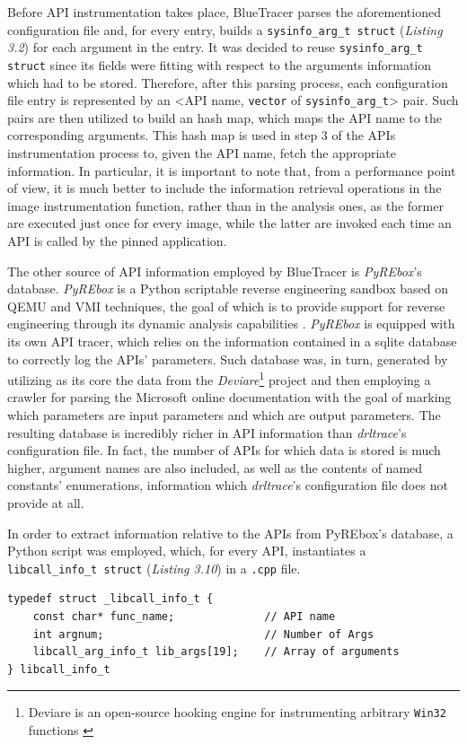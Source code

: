 Before API instrumentation takes place, BlueTracer parses the aforementioned configuration file and, for every entry, builds a \texttt{sysinfo\_arg\_t struct} (\textit{Listing 3.2}) for each argument in the entry. It was decided to reuse \texttt{sysinfo\_arg\_t struct} since its fields were fitting with respect to the arguments information which had to be stored. Therefore, after this parsing process, each configuration file entry is represented by an <API name, \texttt{vector} of \texttt{sysinfo\_arg\_t}> pair. Such pairs are then utilized to build an hash map, which maps the API name to the corresponding arguments. This hash map is used in step 3 of the APIs instrumentation process to, given the API name, fetch the appropriate information. In particular, it is important to note that, from a performance point of view, it is much better to include the information retrieval operations in the image instrumentation function, rather than in the analysis ones, as the former are executed just once for every image, while the latter are invoked each time an API is called by the pinned application.

The other source of API information employed by BlueTracer is \textit{PyREbox}'s database. \textit{PyREbox} is a Python scriptable reverse engineering sandbox based on QEMU and VMI techniques, the goal of which is to provide support for reverse engineering through its dynamic analysis capabilities \cite{Pyrebox}. \textit{PyREbox} is equipped with its own API tracer, which relies on the information contained in a sqlite database to correctly log the APIs' parameters. Such database was, in turn, generated by utilizing as its core the data from the \textit{Deviare}\footnote{Deviare is an open-source hooking engine for instrumenting arbitrary \texttt{Win32} functions \cite{Deviare}} project and then employing a crawler for parsing the Microsoft online documentation with the goal of marking which parameters are input parameters and which are output parameters. The resulting database is incredibly richer in API information than \textit{drltrace}'s configuration file. In fact, the number of APIs for which data is stored is much higher, argument names are also included, as well as the contents of named constants' enumerations, information which \textit{drltrace}'s configuration file does not provide at all.

In order to extract information relative to the APIs from PyREbox's database, a Python script was employed, which, for every API, instantiates a \texttt{libcall\_info\_t struct} (\textit{Listing 3.10}) in a \texttt{.cpp} file.
\\
\begin{lstlisting}[caption={\texttt{struct} containing API-related information from PyREbox's database},captionpos=b]
typedef struct _libcall_info_t {
	const char* func_name;     			// API name
	int argnum;				   			// Number of Args
	libcall_arg_info_t lib_args[19];	// Array of arguments
} libcall_info_t
\end{lstlisting}

